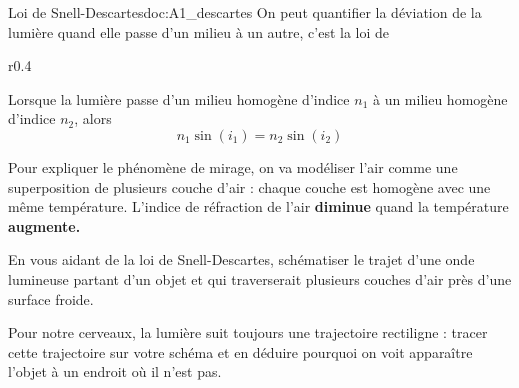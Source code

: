 \begin{doc}{Loi de Snell-Descartes}{doc:A1_descartes}
  On peut quantifier la déviation de la lumière quand elle passe d'un milieu à un autre, c'est la loi de 

  \vspace*{-16pt}
  \begin{wrapfigure}{r}{0.4\linewidth}
    \centering
  \end{wrapfigure}
  \phantom{b}
  \begin{importants}
    Lorsque la lumière passe d'un milieu homogène d'indice $n_1$ à un milieu homogène d'indice $n_2$, alors
    \begin{equation*}
      n_1 \sin(i_1) = n_2 \sin(i_2)
    \end{equation*}
  \end{importants}
  \phantom{b}
\end{doc}

\mesure
Pour expliquer le phénomène de mirage, on va modéliser l'air comme une superposition de plusieurs couche d'air : chaque couche est homogène avec une même température.
L'indice de réfraction de l'air \textbf{diminue} quand la température \textbf{augmente.}

En vous aidant de la loi de Snell-Descartes, schématiser le trajet d'une onde lumineuse partant d'un objet et qui traverserait plusieurs couches d'air près d'une surface froide.

\mesure 
Pour notre cerveaux, la lumière suit toujours une trajectoire rectiligne : tracer cette trajectoire sur votre schéma et en déduire pourquoi on voit apparaître l'objet à un endroit où il n'est pas.
